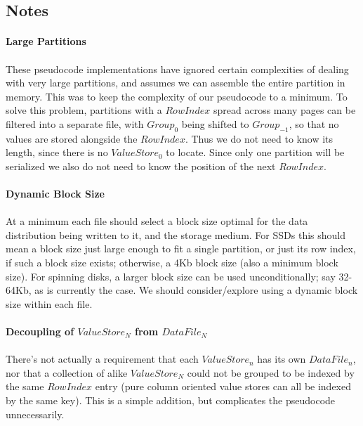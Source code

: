 \documentclass[fleqn]{article}
\begin{document}
\subsection{Notes}
\small
\paragraph{Large Partitions}
\paragraph{}
    These pseudocode implementations have ignored certain complexities of dealing with very large
    partitions, and assumes we can assemble the entire partition in memory. This was to keep
    the complexity of our pseudocode to a minimum. To solve this problem, partitions with a $RowIndex$ 
    spread across many pages can be filtered into a separate
    file, with $Group_0$ being shifted to $Group_{-1}$, so that no values are stored alongside
    the $RowIndex$. Thus we do not need to know its length, since there is no $ValueStore_0$ to locate.
    Since only one partition will be serialized we also do not need to know the position of the next $RowIndex$.
\paragraph{Dynamic Block Size}
\paragraph{}
    At a minimum each file should select a block size optimal for the data distribution being written to it, 
    and the storage medium. For SSDs this should mean a block size just large enough to fit a single partition, 
    or just its row index, if such a block size exists; otherwise, a 4Kb block size (also a minimum block size).
    For spinning disks, a larger block size can be used unconditionally; say 32-64Kb, as is currently the case.
    We should consider/explore using a dynamic block size within each file.
\paragraph{Decoupling of $ValueStore_N$ from $DataFile_N$}
\paragraph{}
    There's not actually a requirement that each $ValueStore_n$ has its own $DataFile_n$, nor that a collection
    of alike $ValueStore_N$ could not be grouped to be indexed by the same $RowIndex$ entry (pure column oriented
    value stores can all be indexed by the same key). This is a simple addition, but complicates the pseudocode
    unnecessarily.
\end{document}
